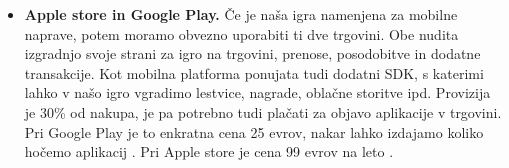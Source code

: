 \documentclass[12pt,a4paper,twoside]{book}
\begin{document}
\begin{itemize}
	\item \textbf{Apple store in Google Play.} Če je naša igra namenjena za mobilne naprave, potem moramo obvezno uporabiti ti dve trgovini. Obe nudita izgradnjo svoje strani za igro na trgovini, prenose, posodobitve in dodatne transakcije. Kot mobilna platforma ponujata tudi dodatni SDK, s katerimi lahko v našo igro vgradimo lestvice, nagrade, oblačne storitve ipd. Provizija je 30\% od nakupa, je pa potrebno tudi plačati za objavo aplikacije v trgovini. Pri Google Play je to enkratna cena 25 evrov, nakar lahko izdajamo koliko hočemo aplikacij \cite{googleplay}. Pri Apple store je cena 99 evrov na leto \cite{applestore}.
\end{itemize} 
\cleardoublepage


\thispagestyle{fancy}
\end{document}

